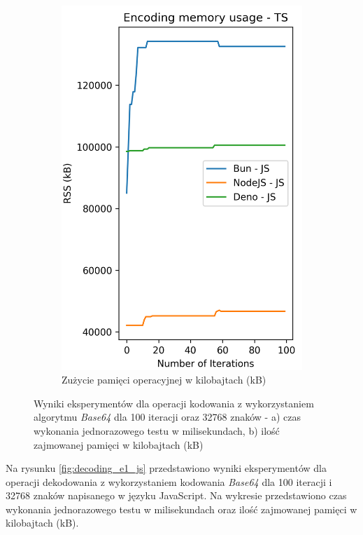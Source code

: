\begin{figure}[H]
\begin{subfigure}[b]{0.4\textwidth}
    \includegraphics[width=\textwidth]{Figures/coding/base64_100_encoding_js_memory.png}
    \caption{Zużycie pamięci operacyjnej w kilobajtach (kB)}
    \label{fig:encoding_e1_js_memory}
  \end{subfigure}
  \hfill
  \caption{Wyniki eksperymentów dla operacji kodowania z wykorzystaniem algorytmu \textit{Base64} dla 100 iteracji oraz 32768 znaków - a) czas wykonania jednorazowego testu w milisekundach, b) ilość zajmowanej pamięci w kilobajtach (kB)}
  \label{fig:encoding_e1_js}
\end{figure}

Na rysunku \ref{fig:decoding_e1_js} przedstawiono wyniki eksperymentów dla operacji dekodowania z wykorzystaniem kodowania \textit{Base64} dla 100 iteracji i 32768 znaków napisanego w języku JavaScript. Na wykresie przedstawiono czas wykonania jednorazowego testu w milisekundach oraz ilość zajmowanej pamięci w kilobajtach (kB).

